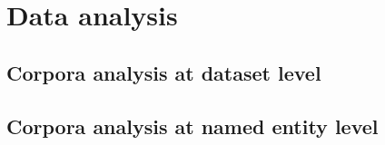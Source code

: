 \section{Data analysis}

\subsection{Corpora analysis at dataset level}

\subsection{Corpora analysis at named entity level}
	
		

